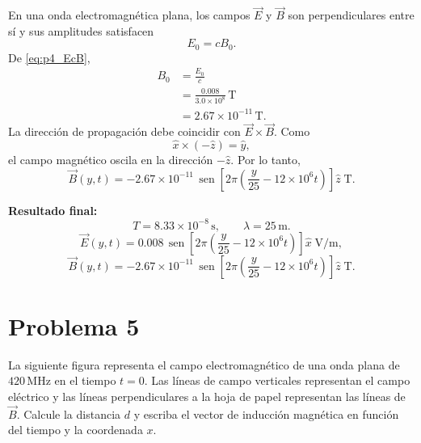 \documentclass[11pt]{article}
\newcommand{\resultadofinal}[1]{%
    \par\medskip
    \noindent\textbf{Resultado final:} #1\par
}
\newcommand{\problematitulo}[1]{%
    \clearpage
    \section*{Problema #1}
    \setcounter{equation}{0}
    \renewcommand{\theequation}{#1.\arabic{equation}}
    \renewcommand{\theHequation}{#1.\arabic{equation}}
}
\newcommand{\sen}{\operatorname{sen}}
\begin{document}
En una onda electromagn\'etica plana, los campos $\vec E$ y $\vec B$ son perpendiculares entre s\'i y sus amplitudes satisfacen
\begin{equation}
    E_0=cB_0.
    \label{eq:p4_EcB}
\end{equation}
De \eqref{eq:p4_EcB},
\begin{align*}
    B_0&=\frac{E_0}{c}\\
       &=\frac{0.008}{3.0\times10^8}\,\mathrm{T}\\
       &=2.67\times10^{-11}\,\mathrm{T}.
\end{align*}
La direcci\'on de propagaci\'on debe coincidir con $\vec E\times\vec B$. Como
\begin{equation*}
    \hat{x}\times(-\hat{z})=\hat{y},
\end{equation*}
el campo magn\'etico oscila en la direcci\'on $-\hat{z}$. Por lo tanto,
\begin{equation*}
    \vec B(y,t)=-2.67\times10^{-11}\,\sen\!\left[2\pi\left(\frac{y}{25}-12\times10^6t\right)\right]\hat{z}\;\mathrm{T}.
\end{equation*}

\resultadofinal{%
\begin{equation*}
    \boxed{T=8.33\times10^{-8}\,\mathrm{s}},
    \qquad
    \boxed{\lambda=25\,\mathrm{m}}.
\end{equation*}
\begin{equation*}
    \boxed{\vec E(y,t)=0.008\,\sen\!\left[2\pi\left(\frac{y}{25}-12\times10^6t\right)\right]\hat{x}\;\mathrm{V/m}},
\end{equation*}
\begin{equation*}
    \boxed{\vec B(y,t)=-2.67\times10^{-11}\,\sen\!\left[2\pi\left(\frac{y}{25}-12\times10^6t\right)\right]\hat{z}\;\mathrm{T}}.
\end{equation*}}

\problematitulo{5}

La siguiente figura representa el campo electromagn\'etico de una onda plana de $420\,\mathrm{MHz}$ en el tiempo $t=0$. Las l\'ineas de campo verticales representan el campo el\'ectrico y las l\'ineas perpendiculares a la hoja de papel representan las l\'ineas de $\vec B$. Calcule la distancia $d$ y escriba el vector de inducci\'on magn\'etica en funci\'on del tiempo y la coordenada $x$.
\end{document}
